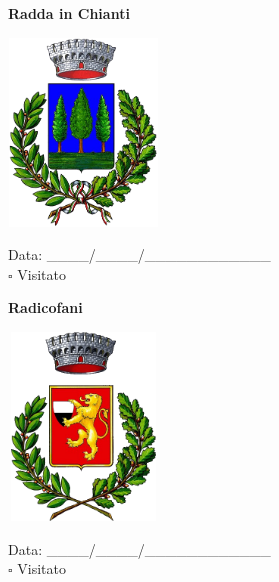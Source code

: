 \documentclass[a5paper,12pt]{article}
\begin{document}
\vspace{0.7cm}

\noindent
\begin{minipage}[t]{0.45\textwidth}
    \begin{center}
        \textbf{Radda in Chianti}
    \end{center}
    \vspace{-0.5cm} %
    \begin{center}
        \includegraphics[height= 5cm, width=4cm]{Toscana/Stemma Radda in Chianti.png}
    \end{center}
    \vspace{-0.4cm} %
    \begin{flushleft}
        Data: \_\_\_\_/\_\_\_\_/\_\_\_\_\_\_\_\_\_\_\_\_ \\
        $\square$ Visitato
    \end{flushleft}
\end{minipage}
\hfill
\noindent
\begin{minipage}[t]{0.45\textwidth}
    \begin{center}
        \textbf{Radicofani}
    \end{center}
    \vspace{-0.5cm} %
    \begin{center}
        \includegraphics[height= 5cm, width=4cm]{Toscana/Stemma Radicofani.png}
    \end{center}
    \vspace{-0.4cm} %
    \begin{flushleft}
        Data: \_\_\_\_/\_\_\_\_/\_\_\_\_\_\_\_\_\_\_\_\_ \\
        $\square$ Visitato
    \end{flushleft}
\end{minipage}
\end{document}

